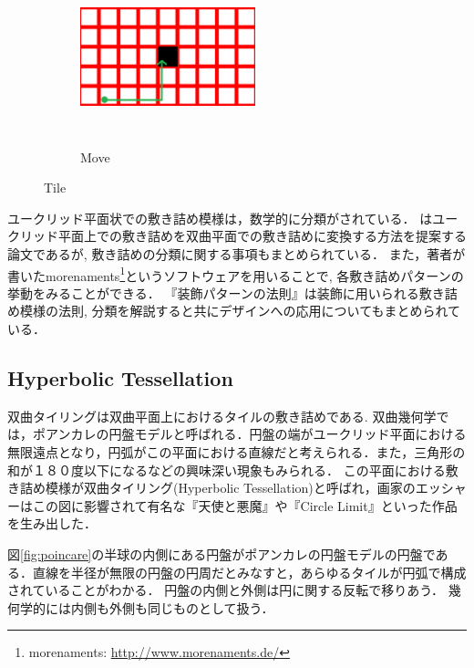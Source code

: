 \begin{figure}[h!tbp]
\begin{subfigure}{0.3\textwidth}
  \end{subfigure}
 \hspace*{\fill}
 \begin{subfigure}{0.3\textwidth}
  \begin{center}
   \includegraphics[width=2in, height=2in, keepaspectratio]{../img/tessellation/tileMove.pdf}
   \caption{Move}
   \label{fig:tileMove}
  \end{center}
 \end{subfigure}
 \hspace*{\fill}
\caption{Tile}
\end{figure}

ユークリッド平面状での敷き詰め模様は，数学的に分類がされている．
\cite{hyperbolization}はユークリッド平面上での敷き詰めを双曲平面での敷き詰めに変換する方法を提案する論文であるが, 敷き詰めの分類に関する事項もまとめられている．
また，著者が書いたmorenaments\footnote{morenaments: \url{http://www.morenaments.de/}}というソフトウェアを用いることで, 各敷き詰めパターンの挙動をみることができる．
『装飾パターンの法則』\cite{tessellationDesign}は装飾に用いられる敷き詰め模様の法則, 分類を解説すると共にデザインへの応用についてもまとめられている．

\subsection{Hyperbolic Tessellation}

双曲タイリングは双曲平面上におけるタイルの敷き詰めである. 
双曲幾何学では，ポアンカレの円盤モデルと呼ばれる．円盤の端がユークリッド平面における無限遠点となり，円弧がこの平面における直線だと考えられる．また，三角形の和が１８０度以下になるなどの興味深い現象もみられる．
この平面における敷き詰め模様が双曲タイリング(Hyperbolic Tessellation)と呼ばれ，画家のエッシャーはこの図に影響されて有名な『天使と悪魔』や『Circle Limit』といった作品を生み出した．

図\ref{fig:poincare}の半球の内側にある円盤がポアンカレの円盤モデルの円盤である．直線を半径が無限の円盤の円周だとみなすと，あらゆるタイルが円弧で構成されていることがわかる．
円盤の内側と外側は円に関する反転で移りあう．
幾何学的には内側も外側も同じものとして扱う．

